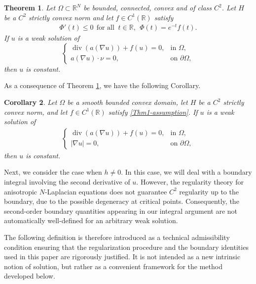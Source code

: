 \documentclass[reqno, 11pt]{amsart} %
\numberwithin{equation}{section}
\newtheorem{thm}{Theorem}[section]
\newtheorem{cor}[thm]{Corollary}
\theoremstyle{definition}
\newcommand{\R}{\mathbb{R}}
\begin{document}
\begin{thm}\label{Thm1}
Let $\Omega\subset\R^N$ be bounded, connected, convex and of class $C^2$.  Let $H$ be a $C^2$ strictly convex norm and let $f\in C^1(\R)$ satisfy
\begin{align}\label{Thm1-assumption}
        \Phi'(t)\le 0 \ \ \text{for all }\ t\in\R, \ \ \Phi(t)=e^{-t}f(t).
\end{align}
If $u$ is a weak solution of
\begin{equation}\label{Thm1-equ}
    \begin{cases}
        \operatorname{div}(a(\nabla u))+f(u)=0, &\text{in }\Omega,\\
        a(\nabla u)\cdot\nu=0, &\text{on }\partial\Omega,
    \end{cases}
\end{equation}
then $u$ is constant.
\end{thm}

As a consequence of Theorem \ref{Thm1}, we have the following Corollary.

\begin{cor}\label{Thm5}
    Let $\Omega$ be a smooth bounded convex domain, let $H$ be a $C^2$ strictly convex norm, and let $f\in C^1(\R)$ satisfy \eqref{Thm1-assumption}.  If $u$ is a weak solution of
    \begin{align}\label{Thm5-equ}
        \begin{cases}
            \operatorname{div}(a(\nabla u))+f(u)=0, & \text{in }\Omega,\\
            |\nabla u|=0, & \text{on }\partial\Omega,
        \end{cases}
    \end{align}
    then $u$ is constant.
\end{cor}

Next, we consider the case when $h \neq 0$. In this case, we will deal with a boundary integral involving the second derivative of $u$. However, the regularity theory for anisotropic $N$-Laplacian equations does not guarantee $C^2$ regularity up to the boundary, due to the possible degeneracy at critical points. Consequently, the second-order boundary quantities appearing in our integral argument are not automatically well-defined for an arbitrary weak solution.

The following definition is therefore introduced as a technical admissibility condition ensuring that the regularization procedure and the boundary identities used in this paper are rigorously justified. It is not intended as a new intrinsic notion of solution, but rather as a convenient framework for the method developed below.
\end{document}
